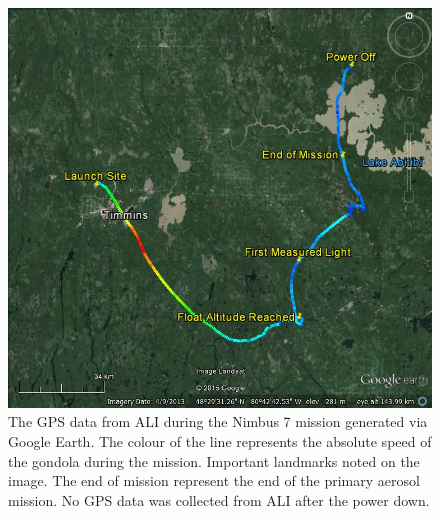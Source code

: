 \documentclass[12pt]{article}
\begin{document}
\begin{figure}
    \includegraphics[width=1.0\textwidth]{./Images/5-1-AliGpsDataGoogleMaps.jpg}
    \caption{The GPS data from ALI during the Nimbus 7 mission generated via Google Earth. The colour of the line represents the absolute speed of the gondola during the mission. Important landmarks noted on the image. The end of mission represent the end of the primary aerosol mission. No GPS data was collected from ALI after the power down.}
    \label{fig:5.1:nimbus7FlightPath}
\end{figure}
\end{document}

